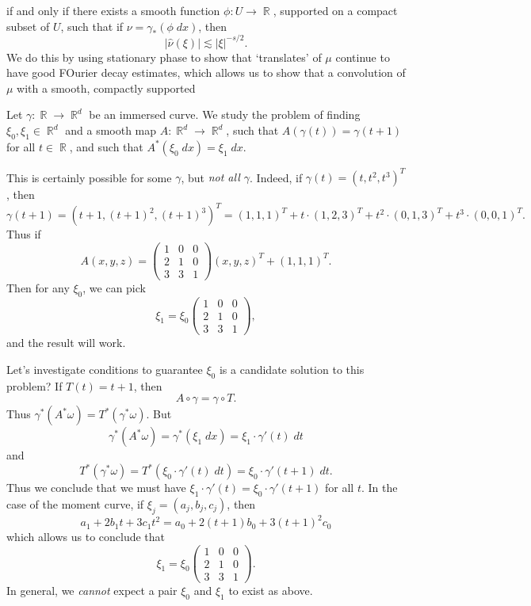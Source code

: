 \documentclass[dvipsnames,letterpaper,12pt]{article}
\DeclareMathOperator{\RR}{\mathbb{R}}
\begin{document}
if and only if there exists a smooth function $\phi:U \to \RR$, supported on a compact subset of $U$, such that if $\nu = \gamma_*( \phi\; dx)$, then
%
\[ |\widehat{\nu}(\xi)| \lesssim |\xi|^{-s/2}. \]
%
We do this by using stationary phase to show that `translates' of $\mu$ continue to have good FOurier decay estimates, which allows us to show that a convolution of $\mu$ with a smooth, compactly supported




\newpage

Let $\gamma: \RR \to \RR^d$ be an immersed curve. We study the problem of finding $\xi_0, \xi_1 \in \RR^d$ and a smooth map $A: \RR^d \to \RR^d$, such that $A(\gamma(t)) = \gamma(t + 1)$ for all $t \in \RR$, and such that $A^*( \xi_0\; dx) = \xi_1\; dx$.

This is certainly possible for some $\gamma$, but \emph{not all $\gamma$}. Indeed, if $\gamma(t) = (t,t^2,t^3)^T$, then
%
\[ \gamma(t + 1) = (t+1,(t+1)^2, (t+1)^3)^T = (1,1,1)^T + t \cdot (1,2,3)^T + t^2 \cdot (0,1,3)^T + t^3 \cdot (0,0,1)^T. \]
%
Thus if
%
\[ A(x,y,z) = \begin{pmatrix} 1 & 0 & 0 \\ 2 & 1 & 0 \\ 3 & 3 & 1 \end{pmatrix} (x,y,z)^T + (1,1,1)^T. \]
%
Then for any $\xi_0$, we can pick
%
\[ \xi_1 = \xi_0 \begin{pmatrix} 1 & 0 & 0 \\ 2 & 1 & 0 \\ 3 & 3 & 1 \end{pmatrix}, \]
%
and the result will work.

Let's investigate conditions to guarantee $\xi_0$ is a candidate solution to this problem? If $T(t) = t + 1$, then
%
\[ A \circ \gamma = \gamma \circ T. \]
%
Thus $\gamma^*(A^* \omega) = T^*(\gamma^* \omega)$. But
%
\[ \gamma^*(A^* \omega) = \gamma^*(\xi_1\; dx) = \xi_1 \cdot \gamma'(t)\; dt \]
%
and
%
\[ T^*(\gamma^* \omega) = T^*( \xi_0 \cdot \gamma'(t)\; dt ) = \xi_0 \cdot \gamma'(t+1)\; dt. \]
%
Thus we conclude that we must have $\xi_1 \cdot \gamma'(t) = \xi_0 \cdot \gamma'(t+1)$ for all $t$. In the case of the moment curve, if $\xi_j = (a_j,b_j,c_j)$, then
%
\[ a_1 + 2b_1 t + 3c_1 t^2 = a_0 + 2(t+1) b_0 + 3(t + 1)^2 c_0 \]
%
which allows us to conclude that
%
\[ \xi_1 = \xi_0 \begin{pmatrix} 1 & 0 & 0 \\ 2 & 1 & 0 \\ 3 & 3 & 1 \end{pmatrix}. \]
%
In general, we \emph{cannot} expect a pair $\xi_0$ and $\xi_1$ to exist as above.
\end{document}
